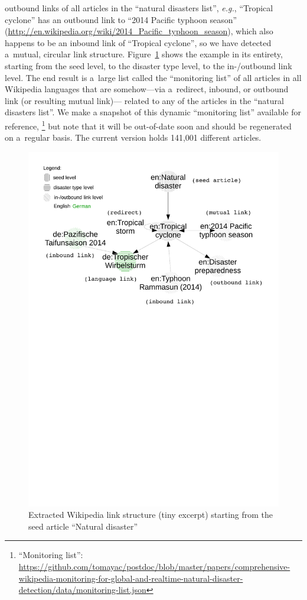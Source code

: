 \documentclass[letterpaper]{article}
\begin{document}
outbound links of all articles in the ``natural disasters list'',
\emph{e.g.}, ``Tropical cyclone'' has an outbound link to
``2014 Pacific typhoon season''
(\url{http://en.wikipedia.org/wiki/2014_Pacific_typhoon_season}),
which also happens to be an inbound link of ``Tropical cyclone'',
so we have detected a~mutual, circular link structure.
Figure~\ref{fig:link-structure} shows the example in its entirety,
starting from the seed level, to the disaster type level, to the in-/outbound link level.
The end result is a~large list called the ``monitoring list''
of all articles in all Wikipedia languages
that are somehow---via a~redirect, inbound, or outbound link (or resulting mutual link)---%
related to any of the articles
in the ``natural disasters list''.
We make a snapshot of this dynamic ``monitoring list'' available for reference,%
\footnote{``Monitoring list'':
\url{https://github.com/tomayac/postdoc/blob/master/papers/comprehensive-wikipedia-monitoring-for-global-and-realtime-natural-disaster-detection/data/monitoring-list.json}}
but note that it will be out-of-date soon and should be regenerated
on a~regular basis.
The current version holds 141,001 different articles.

\begin{figure}[hbt]
  \centering
  \includegraphics[width=0.75\linewidth]{link-structure}
  \caption{Extracted Wikipedia link structure (tiny excerpt) starting from the seed article ``Natural disaster''}
  \label{fig:link-structure}
\end{figure}
\end{document}
